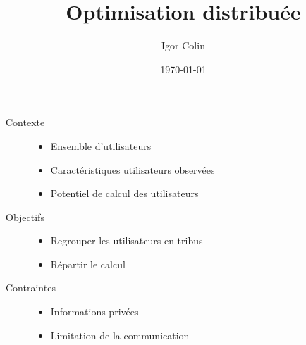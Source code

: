 \documentclass[c]{beamer}
\title{Optimisation distribu\'ee}
\author{Igor Colin}
\date{\today}
\begin{document}
\begin{frame}
    \begin{description}
        \item[Contexte]
            \begin{itemize}
                \item Ensemble d'utilisateurs
                \item Caract\'eristiques utilisateurs observ\'ees
                \item Potentiel de calcul des utilisateurs
            \end{itemize}
        \vspace{.3cm}
        \item[Objectifs]
            \begin{itemize}
                \item Regrouper les utilisateurs en tribus
                \item R\'epartir le calcul
            \end{itemize}
        \vspace{.3cm}
        \item[Contraintes]
            \begin{itemize}
                \item Informations priv\'ees
                \item Limitation de la communication
            \end{itemize}
        \vspace{.3cm}
    \end{description}
\end{frame}
\end{document}
